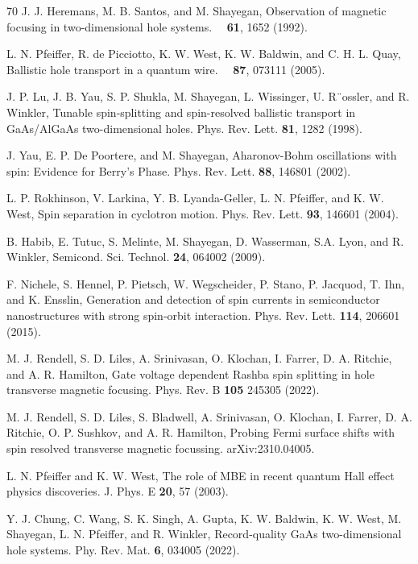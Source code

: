 \documentclass[reprint,amsmath,amssymb,aps,prl,nobibnotes,superscriptaddress]{revtex4-1}
\begin{document}
\begin{thebibliography}{70}
 J. J. Heremans, M. B. Santos, and M. Shayegan, Observation of magnetic focusing in two-dimensional
hole systems. \apl\ \ \textbf{61}, 1652 (1992).

 L. N. Pfeiffer, R. de Picciotto, K. W. West, K. W. Baldwin, and C. H. L.  Quay,  Ballistic hole transport in a quantum wire. \apl\ \ \textbf{87}, 073111 (2005).

 J. P. Lu, J. B. Yau, S. P. Shukla, M. Shayegan,
L. Wissinger, U. R¨ossler, and R. Winkler, Tunable
spin-splitting and spin-resolved ballistic transport in
GaAs/AlGaAs two-dimensional holes. Phys. Rev. Lett.
\textbf{81}, 1282 (1998).

 J. Yau, E. P. De Poortere, and M. Shayegan, Aharonov-Bohm oscillations with spin: Evidence for Berry’s Phase.
Phys. Rev. Lett. \textbf{88}, 146801 (2002).

 L. P. Rokhinson, V. Larkina, Y. B. Lyanda-Geller, L. N.
Pfeiffer, and K. W. West, Spin separation in cyclotron
motion. Phys. Rev. Lett. \textbf{93}, 146601 (2004).

B. Habib, E. Tutuc, S. Melinte, M. Shayegan, D. Wasserman, S.A. Lyon, and R. Winkler, Semicond. Sci. Technol. \textbf{24}, 064002 (2009).

 F. Nichele, S. Hennel, P. Pietsch, W. Wegscheider, P.
Stano, P. Jacquod, T. Ihn, and K. Ensslin, Generation
and detection of spin currents in semiconductor nanostructures with strong spin-orbit interaction. Phys. Rev. Lett. \textbf{114}, 206601 (2015).

 M. J. Rendell, S. D. Liles, A. Srinivasan, O. Klochan, I. Farrer, D. A. Ritchie, and A. R. Hamilton, Gate voltage dependent Rashba spin splitting in hole transverse magnetic focusing. Phys. Rev. B \textbf{105} 245305 (2022).

  M. J. Rendell, S. D. Liles, S. Bladwell, A. Srinivasan, O. Klochan, I. Farrer, D. A. Ritchie, O. P. Sushkov, and A. R. Hamilton, Probing Fermi surface shifts with spin resolved transverse magnetic focussing. arXiv:2310.04005.

 L. N. Pfeiffer and K. W. West, The role of MBE in recent quantum Hall effect physics discoveries. J. Phys. E \textbf{20}, 57 (2003).

Y. J. Chung, C. Wang, S. K. Singh, A. Gupta, K. W. Baldwin, K. W. West, M. Shayegan,
L. N. Pfeiffer, and R. Winkler, Record-quality GaAs two-dimensional hole
systems. Phy. Rev. Mat. \textbf{6}, 034005 (2022).


\end{thebibliography}
\end{document}
